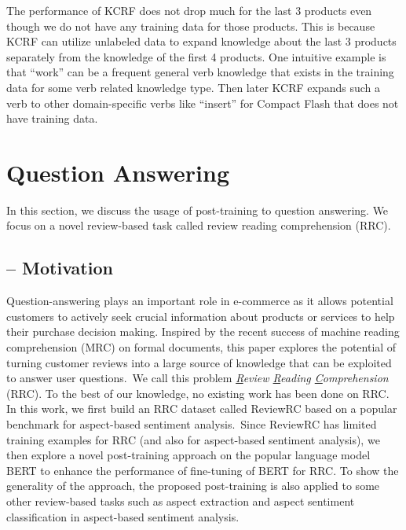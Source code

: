 The performance of KCRF does not drop much for the last 3 products even though we do not have any training data for those products. This is because KCRF can utilize unlabeled data to expand knowledge about the last 3 products separately from the knowledge of the first 4 products. One intuitive example is that ``work'' can be a frequent general verb knowledge that exists in the training data for some verb related knowledge type. Then later KCRF expands such a verb to other domain-specific verbs like ``insert'' for Compact Flash that does not have training data.  


\section{Question Answering}
\label{chap6:sec:qa}

In this section, we discuss the usage of post-training to question answering.
We focus on a novel review-based task called review reading comprehension (RRC).

\subsection{-- Motivation}
\label{chap6:sec:rrc}

Question-answering plays an important role in e-commerce as it allows potential customers to actively seek crucial information about products or services to help their purchase decision making. 
Inspired by the recent success of machine reading comprehension (MRC) on formal documents, this paper explores the potential of turning customer reviews into a large source of knowledge that can be exploited to answer user questions.~We call this problem \textit{\underline{R}eview \underline{R}eading \underline{C}omprehension} (RRC). To the best of our knowledge, no existing work has been done on RRC. In this work, we first build an RRC dataset called ReviewRC based on a popular benchmark for aspect-based sentiment analysis.~Since ReviewRC has limited training examples for RRC (and also for aspect-based sentiment analysis), we then explore a novel post-training approach on the popular language model BERT to enhance the performance of fine-tuning of BERT for RRC.
To show the generality of the approach, the proposed post-training is also applied to some other review-based tasks such as aspect extraction and aspect sentiment classification in aspect-based sentiment analysis. 

